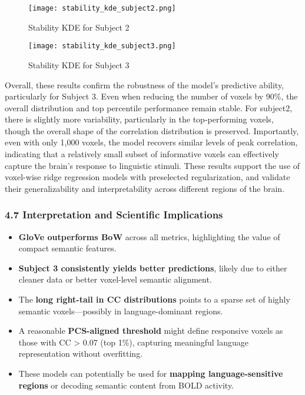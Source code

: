 \documentclass[11pt]{article}
\begin{document}
\begin{figure}
\centering
\texttt{[image: stability\_kde\_subject2.png]}
\caption{Stability KDE for Subject 2}
\end{figure}

\begin{figure}
\centering
\texttt{[image: stability\_kde\_subject3.png]}
\caption{Stability KDE for Subject 3}
\end{figure}

Overall, these results confirm the robustness of the model's predictive
ability, particularly for Subject 3. Even when reducing the number of
voxels by 90\%, the overall distribution and top percentile performance
remain stable. For subject2, there is slightly more variability,
particularly in the top-performing voxels, though the overall shape of
the correlation distribution is preserved. Importantly, even with only
1,000 voxels, the model recovers similar levels of peak correlation,
indicating that a relatively small subset of informative voxels can
effectively capture the brain's response to linguistic stimuli. These
results support the use of voxel-wise ridge regression models with
preselected regularization, and validate their generalizability and
interpretability across different regions of the brain.

\hypertarget{interpretation-and-scientific-implications}{%
\subsubsection{4.7 Interpretation and Scientific
Implications}\label{interpretation-and-scientific-implications}}

\begin{itemize}
\item
  \textbf{GloVe outperforms BoW} across all metrics, highlighting the
  value of compact semantic features.
\item
  \textbf{Subject 3 consistently yields better predictions}, likely due
  to either cleaner data or better voxel-level semantic alignment.
\item
  The \textbf{long right-tail in CC distributions} points to a sparse
  set of highly semantic voxels---possibly in language-dominant regions.
\item
  A reasonable \textbf{PCS-aligned threshold} might define responsive
  voxels as those with CC \textgreater{} 0.07 (top 1\%), capturing
  meaningful language representation without overfitting.
\item
  These models can potentially be used for \textbf{mapping
  language-sensitive regions} or decoding semantic content from BOLD
  activity.
\end{itemize}
\end{document}
